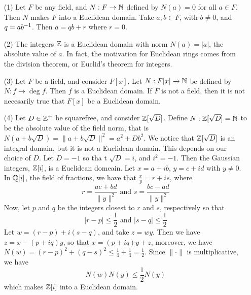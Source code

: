 \begin{example}\label{2.1}
    \begin{enumerate}
        \item[(1)] Let $F$ be any field, and  $N:F \xrightarrow{} \mathbb{N}$ defined by
            $N(a)=0$ for all $a \in F$. Then  $N$ makes  $F$ into a Euclidean
            domain. Take  $a,b \in F$, with  $b \neq 0$, and  $q=ab^{-1}$. Then
            $a=qb+r$ where  $r=0$.

        \item[(2)] The integers $\mathbb{Z}$ is a Euclidean domain with norm $N(a)=|a|$,
            the absolute value of $a$. In fact, the motivation for Euclidean
            rings comes from the division theorem, or Euclid's theorem for
            integers.

        \item[(3)] Let $F$ be a field, and consider  $F[x]$. Let $N:F[x]
            \xrightarrow{} \mathbb{N}$ be defined by $N:f \xrightarrow{} \deg{f}$. Then
            $f$ is a Euclidean domain. If  $F$ is not a field, then it is not
            necesarily true that $F[x]$ be a Euclidean domain.

        \item[(4)] Let $D \in \mathbb{Z}^+$ be squarefree, and consider  $\mathbb{Z}[\sqrt{D}]$.
            Define $N:\mathbb{Z}[\sqrt{D}]=\mathbb{N}$ to be the absolute value of the field
            norm, that is $N(a+b\sqrt{D})=\|a+b\sqrt{D}\|^2=a^2+Db^2$. We notice
            that $\mathbb{Z}[\sqrt{D}]$ is an integral domain, but it is not a Euclidean
            domain. This depends on our choice of $D$. Let  $D=-1$ so tha t
            $\sqrt{D}=i$, and $i^2=-1$. Then the Gaussian integers, $\mathbb{Z}[i]$, is
            a Euclidean domeain. Let $x=a+ib$,  $y=c+id$ with  $y \neq 0$. In
            $\mathbb{Q}[i]$, the field of fractions, we have that $\frac{x}{y}=r+is$,
            where
            \begin{equation*}
                r=\frac{ac+bd}{\|y\|^2} \text{ and } s=\frac{bc-ad}{\|y\|^2}
            \end{equation*}
            Now, let $p$ and  $q$ be the integers closest to $r$ and $s$,
            respectively so that
            \begin{equation*}
                |r-p| \leq \frac{1}{2} \text{ and } |s-q| \leq \frac{1}{2}
            \end{equation*}
            Let $w=(r-p)+i(s-q)$, and take $z=wy$. Then we have  $z=x-(p+iq)y$,
            so that $x=(p+iq)y+z$, moreover, we have $N(w)=(r-p)^2+(q-s)^2 \leq
            \frac{1}{4}+\frac{1}{4}=\frac{1}{2}$. Since $\|\cdot\|$ is
            multiplicative, we have
            \begin{equation*}
                N(w)N(y) \leq \frac{1}{2}N(y)
            \end{equation*}
            which makes $\mathbb{Z}[i]$ into a Euclidean domain.


\end{enumerate}
\end{example}
